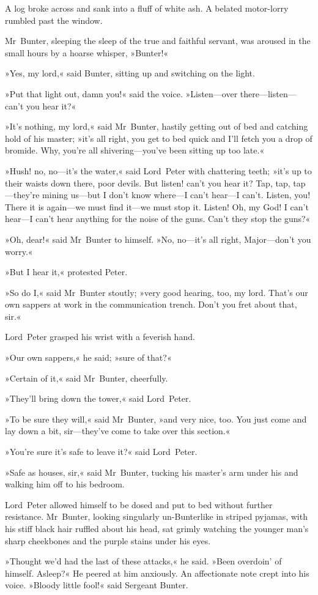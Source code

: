 A log broke across and sank into a fluff of white ash. A belated motor-lorry rumbled past the window.

Mr~Bunter, sleeping the sleep of the true and faithful servant, was aroused in the small hours by a hoarse whisper, »Bunter!«

»Yes, my lord,« said Bunter, sitting up and switching on the light.

»Put that light out, damn you!« said the voice. »Listen—over there—listen—can't you hear it?«

»It's nothing, my lord,« said Mr~Bunter, hastily getting out of bed and catching hold of his master; »it's all right, you get to bed quick and I'll fetch you a drop of bromide. Why, you're all shivering—you've been sitting up too late.«

»Hush! no, no—it's the water,« said Lord~Peter with chattering teeth; »it's up to their waists down there, poor devils. But listen! can't you hear it? Tap, tap, tap—they're mining us—but I don't know where—I can't hear—I can't. Listen, you! There it is again—we must find it—we must stop it\textellipsis . Listen! Oh, my God! I can't hear—I can't hear anything for the noise of the guns. Can't they stop the guns?«

»Oh, dear!« said Mr~Bunter to himself. »No, no—it's all right, Major—don't you worry.«

»But I hear it,« protested Peter.

»So do I,« said Mr~Bunter stoutly; »very good hearing, too, my lord. That's our own sappers at work in the communication trench. Don't you fret about that, sir.«

Lord~Peter grasped his wrist with a feverish hand.

»Our own sappers,« he said; »sure of that?«

»Certain of it,« said Mr~Bunter, cheerfully.

»They'll bring down the tower,« said Lord~Peter.

»To be sure they will,« said Mr~Bunter, »and very nice, too. You just come and lay down a bit, sir—they've come to take over this section.«

»You're sure it's safe to leave it?« said Lord~Peter.

»Safe as houses, sir,« said Mr~Bunter, tucking his master's arm under his and walking him off to his bedroom.

Lord~Peter allowed himself to be dosed and put to bed without further resistance. Mr~Bunter, looking singularly un-Bunterlike in striped pyjamas, with his stiff black hair ruffled about his head, sat grimly watching the younger man's sharp cheekbones and the purple stains under his eyes.

»Thought we'd had the last of these attacks,« he said. »Been overdoin' of himself. Asleep?« He peered at him anxiously. An affectionate note crept into his voice. »Bloody little fool!« said Sergeant Bunter.